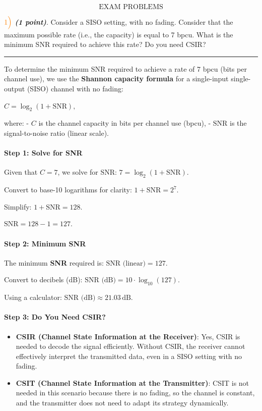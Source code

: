 \documentclass[11pt]{article}
\providecommand{\tightlist}{%
      \setlength{\itemsep}{0pt}\setlength{\parskip}{0pt}}
\begin{document}
    \[\text{EXAM PROBLEMS}\]

    \(\color{orange}1\Bigl)\) \textbf{\emph{(1 point)}}. Consider a SISO
setting, with no fading. Consider that the maximum possible rate (i.e.,
the capacity) is equal to 7 bpcu. What is the minimum SNR required to
achieve this rate? Do you need CSIR?

    \begin{center}\rule{0.5\linewidth}{0.5pt}\end{center}

To determine the minimum SNR required to achieve a rate of 7 bpcu (bits
per channel use), we use the \textbf{Shannon capacity formula} for a
single-input single-output (SISO) channel with no fading:

\(C = \log_2(1 + \text{SNR}),\)

where: - \(C\) is the channel capacity in bits per channel use (bpcu), -
\(\text{SNR}\) is the signal-to-noise ratio (linear scale).

\paragraph{Step 1: Solve for SNR}\label{step-1-solve-for-snr}

Given that \(C = 7\), we solve for \(\text{SNR}\):
\(7 = \log_2(1 + \text{SNR}).\)

Convert to base-10 logarithms for clarity: \(1 + \text{SNR} = 2^7.\)

Simplify: \(1 + \text{SNR} = 128.\)

\(\text{SNR} = 128 - 1 = 127.\)

\paragraph{Step 2: Minimum SNR}\label{step-2-minimum-snr}

The minimum \textbf{SNR} required is: \(\text{SNR (linear)} = 127.\)

Convert to decibels (dB): \(\text{SNR (dB)} = 10 \cdot \log_{10}(127).\)

Using a calculator: \(\text{SNR (dB)} \approx 21.03 \, \text{dB}.\)

\paragraph{Step 3: Do You Need CSIR?}\label{step-3-do-you-need-csir}

\begin{itemize}
\tightlist
\item
  \textbf{CSIR (Channel State Information at the Receiver)}: Yes, CSIR
  is needed to decode the signal efficiently. Without CSIR, the receiver
  cannot effectively interpret the transmitted data, even in a SISO
  setting with no fading.
\item
  \textbf{CSIT (Channel State Information at the Transmitter)}: CSIT is
  not needed in this scenario because there is no fading, so the channel
  is constant, and the transmitter does not need to adapt its strategy
  dynamically.
\end{itemize}
\end{document}
